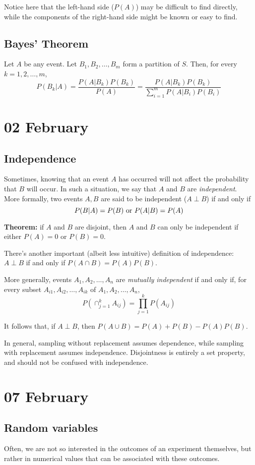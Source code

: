 \documentclass[12pt]{article}
\begin{document}
Notice here that the left-hand side ($P(A)$) may be difficult to find directly, while the components of the right-hand side might be known or easy to find.

\subsection{Bayes' Theorem}
Let $A$ be any event. Let $B_1, B_2, \dots, B_m$ form a partition of $S$. Then, for every $k = 1, 2, \dots, m$,
\[
    P(B_k | A) = \frac{P(A | B_k) P(B_k)}{P(A)} = \frac{P(A | B_k) P(B_k)}{\sum_{i=1}^m P(A | B_i) P(B_i)}
\]

\section{02 February}
\subsection{Independence}
Sometimes, knowing that an event $A$ has occurred will not affect the probability that $B$ will occur. In such a situation, we say that $A$ and $B$ are \emph{independent}. More formally, two events $A,B$ are said to be independent ($A \perp B$) if and only if
\[
    P(B | A) = P(B) \textnormal{ or } P(A | B) = P(A)
\]

\textbf{Theorem:} if $A$ and $B$ are disjoint, then $A$ and $B$ can only be independent if either $P(A) = 0$ or $P(B) = 0$.

There's another important (albeit less intuitive) definition of independence: $A \perp B$ if and only if $P(A \cap B) = P(A)P(B)$. 

More generally, events $A_1, A_2, \dots, A_n$ are \emph{mutually independent} if and only if, for every subset $A_{i1}, A_{i2}, \dots, A_{ik}$ of $A_1, A_2, \dots, A_n$,
\[
    P(\cap_{j=1}^k A_{ij}) = \prod_{j=1}^k P(A_{ij})
\]

It follows that, if $A \perp B$, then $P(A \cup B) = P(A) + P(B) - P(A) P(B)$.

In general, sampling without replacement assumes dependence, while sampling with replacement assumes independence.  Disjointness is entirely a set property, and should not be confused with independence.  

\section{07 February} 
\subsection{Random variables}
Often, we are not so interested in the outcomes of an experiment themselves, but rather in numerical values that can be associated with these outcomes. 
\end{document}
